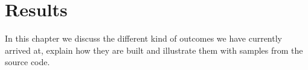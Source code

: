 \chapter{Results}
\label{chp:results}

In this chapter we discuss the different kind of outcomes we have currently arrived at, explain how they are built and illustrate them with samples from the source code.



